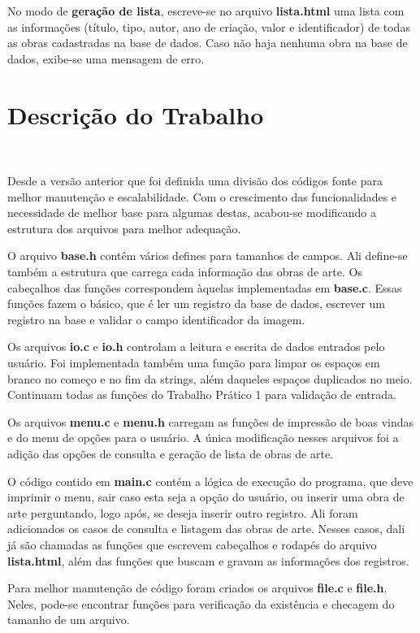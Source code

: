 \documentclass{article}
\begin{document}
No modo de \textbf{geração de lista}, escreve-se no arquivo \textbf{lista.html} uma lista com as informações (título, tipo, autor, ano de criação, valor e identificador) de todas as obras cadastradas na base de dados. Caso não haja nenhuma obra na base de dados, exibe-se uma mensagem de erro.

\section{Descrição do Trabalho}\

Desde a versão anterior que foi definida uma divisão dos códigos fonte para melhor manutenção e escalabilidade. Com o crescimento das funcionalidades e necessidade de melhor base para algumas destas, acabou-se modificando a estrutura dos arquivos para melhor adequação.

O arquivo \textbf{base.h} contêm vários defines para tamanhos de campos. Ali define-se também a estrutura que carrega cada informação das obras de arte. Os cabeçalhos das funções correspondem àquelas implementadas em \textbf{base.c}. Essas funções fazem o básico, que é ler um registro da base de dados, escrever um registro na base e validar o campo identificador da imagem.

Os arquivos \textbf{io.c} e \textbf{io.h} controlam a leitura e escrita de dados entrados pelo usuário. Foi implementada também uma função para limpar os espaços em branco no começo e no fim da strings, além daqueles espaços duplicados no meio. Continuam todas as funções do Trabalho Prático 1 para validação de entrada.

Os arquivos \textbf{menu.c} e \textbf{menu.h} carregam as funções de impressão de boas vindas e do menu de opções para o usuário. A única modificação nesses arquivos foi a adição das opções de consulta e geração de lista de obras de arte.

O código contido em \textbf{main.c} contém a lógica de execução do programa, que deve imprimir o menu, sair caso esta seja a opção do usuário, ou inserir uma obra de arte perguntando, logo após, se deseja inserir outro registro. Ali foram adicionados os casos de consulta e listagem das obras de arte. Nesses casos, dali já são chamadas as funções que escrevem cabeçalhos e rodapés do arquivo \textbf{lista.html}, além das funções que buscam e gravam as informações dos registros.

Para melhor manutenção de código foram criados os arquivos \textbf{file.c} e \textbf{file.h}. Neles, pode-se encontrar funções para verificação da existência e checagem do tamanho de um arquivo.
\end{document}
